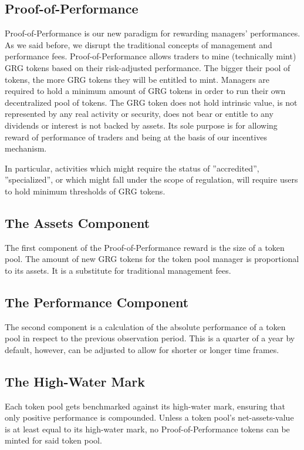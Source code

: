 \documentclass[9pt,oneside]{amsart}
\begin{document}
\begin{multicols}{2}
\section{Proof-of-Performance}
Proof-of-Performance is our new paradigm for rewarding managers’ performances. As we said before, we disrupt the traditional concepts of management and performance fees. Proof-of-Performance allows traders to mine (technically mint) GRG tokens based on their risk-adjusted performance. The bigger their pool of tokens, the more GRG tokens they will be entitled to mint. Managers are required to hold a minimum amount of GRG tokens in order to run their own decentralized pool of tokens.
The GRG token does not hold intrinsic value, is not represented by any real activity or security, does not bear or entitle to any dividends or interest is not backed by assets. Its sole purpose is for allowing reward of performance of traders and being at the basis of our incentives mechanism.

In particular, activities which might require the status of ”accredited”, ”specialized”, or which might fall under the scope of regulation, will require users to hold minimum thresholds of GRG tokens.

\subsection{The Assets Component}
The first component of the Proof-of-Performance reward is the size of a token pool. The amount of new GRG tokens for the token pool manager is proportional to its assets. It is a substitute for traditional management fees. 

\subsection{The Performance Component}
The second component is a calculation of the absolute performance of a token pool in respect to the previous observation period.  This is a quarter of a year by default, however, can be adjusted to allow for shorter or longer time frames.

\subsection{The High-Water Mark}
Each token pool gets benchmarked against its high-water mark, ensuring that only positive performance is compounded. Unless a token pool’s net-assets-value is at least equal to its high-water mark, no Proof-of-Performance tokens can be minted for said token pool.


\end{multicols}
\end{document}
